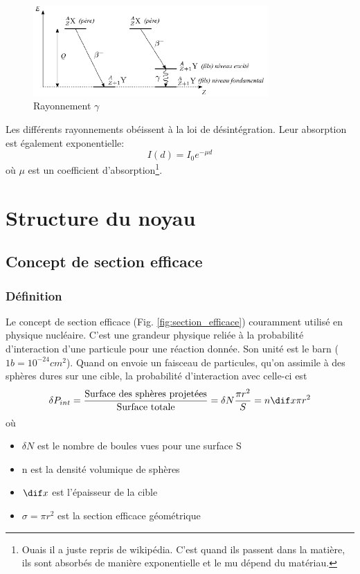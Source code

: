 \begin{figure}[ht]
    \centering
    \includegraphics[width=0.8\textwidth]{Images1/gamma.PNG}
    \caption{Rayonnement $\gamma$}
    \label{fig:rayons_gamma}
\end{figure}
Les différents rayonnements obéissent à la loi de désintégration. Leur absorption est également exponentielle:
\[
    I(d)=I_0e^{-\mu d}
\]
où $\mu$ est un coefficient d'absorption\footnote{Ouais il a juste repris de wikipédia. C'est quand ils passent dans la matière, ils sont absorbés de manière exponentielle et le mu dépend du matériau.}.



\section{Structure du noyau}
\subsection{Concept de section efficace}\label{sec:section_efficace}
\subsubsection{Définition}

Le concept de section efficace (Fig. \ref{fig:section_efficace}) couramment utilisé en physique nucléaire. C'est une grandeur physique reliée à la probabilité d'interaction d'une particule pour une réaction donnée. Son unité est le barn ($1b=10^{-24}cm^2$).
Quand on envoie un faisceau de particules, qu'on assimile à des sphères dures sur une cible, la probabilité d'interaction avec celle-ci est
\[
    \delta P_{int}=\dfrac{\text{Surface des sphères projetées}}{\text{Surface totale}}=\delta N \dfrac{\pi r^2}{S}=n \dif x \pi r^2
\]
où
\begin{itemize}
    \item $\delta N$ est le nombre de boules vues pour une surface S
    \item n est la densité volumique de sphères
    \item $\dif x$ est l'épaisseur de la cible
    \item $\sigma=\pi r^2$ est la section efficace géométrique
\end{itemize}

